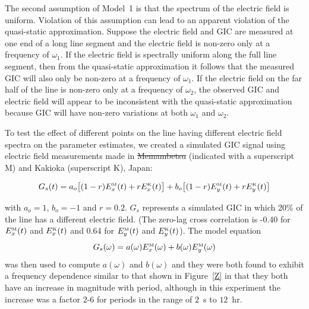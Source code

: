 \documentclass[draft,linenumbers]{agujournal2018}
\providecommand{\DIFaddtex}[1]{{\protect\color{blue}\uwave{#1}}} %
\providecommand{\DIFdeltex}[1]{{\protect\color{red}\sout{#1}}}                      %
\providecommand{\DIFaddbegin}{} %
\providecommand{\DIFaddend}{} %
\providecommand{\DIFdelbegin}{} %
\providecommand{\DIFdelend}{} %
\providecommand{\DIFadd}[1]{\texorpdfstring{\DIFaddtex{#1}}{#1}} %
\providecommand{\DIFdel}[1]{\texorpdfstring{\DIFdeltex{#1}}{}} %
\begin{document}
The second assumption of Model~1 is that the spectrum of the electric field is uniform. Violation of this assumption can lead to an apparent violation of the quasi-static approximation. Suppose the electric field and GIC are measured at one end of a long line segment and the electric field is non-zero only at a frequency of $\omega_1$. If the electric field is spectrally uniform along the full line segment, then from the quasi-static approximation it follows that the measured GIC will also only be non-zero at a frequency of $\omega_1$. If the electric field on the far half of the line is non-zero only at a frequency of $\omega_2$, the observed GIC and electric field will appear to be inconsistent with the quasi-static approximation because GIC will have non-zero variations at both $\omega_1$ and $\omega_2$.

To test the effect of different points on the line having different electric field spectra on the parameter estimates, we created a simulated GIC signal using electric field measurements made in \DIFdelbegin \DIFdel{Memambetsu }\DIFdelend \DIFaddbegin \DIFadd{Memanbetsu }\DIFaddend (indicated with a superscript M) and Kakioka (superscript K), Japan:

\begin{equation}
G_s(t)=a_o\big[(1-r)E^{\mbox{\tiny M}}_x(t) + rE^{\mbox{\tiny K}}_x(t)\big]+b_o\big[(1-r)E^{\mbox{\tiny M}}_y(t) + rE^{\mbox{\tiny K}}_y(t)\big]
\end{equation}

\noindent
with $a_o=1$, $b_o=-1$ and $r=0.2$. $G_s$ represents a simulated GIC in which 20\% of the line has a different electric field. (The zero-lag cross correlation is -0.40 for $E^{\mbox{\tiny M}}_x(t)$ and $E^{\mbox{\tiny K}}_x(t)$ and 0.64 for $E^{\mbox{\tiny M}}_y(t)$ and $E^{\mbox{\tiny K}}_y(t)$). The model equation
\begin{equation}
G_s(\omega)=a(\omega)E^{\mbox{\tiny M}}_x(\omega)+b(\omega)E^{\mbox{\tiny M}}_y(\omega)
\end{equation}
\noindent
was then used to compute $a(\omega)$ and $b(\omega)$ and they were both found to exhibit a frequency dependence similar to that shown in Figure~\ref{Z} in that they both have an increase in magnitude with period, although in this experiment the increase was a factor 2-6 for periods in the range of $2$~s to $12$~hr.
\end{document}
